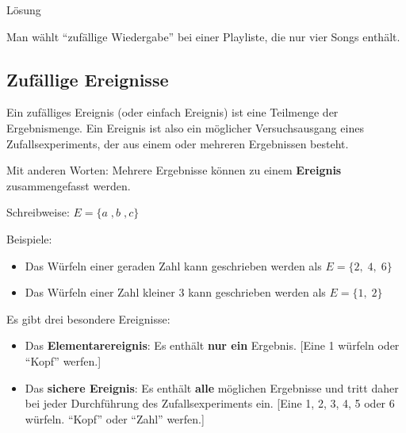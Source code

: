 \documentclass[
  ngerman,
]{book}
\providecommand{\tightlist}{%
  \setlength{\itemsep}{0pt}\setlength{\parskip}{0pt}}
\begin{document}
Lösung

Man wählt ``zufällige Wiedergabe'' bei einer Playliste, die nur vier Songs enthält.

\hypertarget{section-48}{%
\subsubsection*{}\label{section-48}}

\hypertarget{section-49}{%
\subsubsection*{}\label{section-49}}

\hypertarget{zufuxe4llige-ereignisse}{%
\subsection*{Zufällige Ereignisse}\label{zufuxe4llige-ereignisse}}

Ein zufälliges Ereignis (oder einfach Ereignis) ist eine Teilmenge der Ergebnismenge. Ein Ereignis ist also ein möglicher Versuchsausgang eines Zufallsexperiments, der aus einem oder mehreren Ergebnissen besteht.

Mit anderen Worten: Mehrere Ergebnisse können zu einem \textbf{Ereignis} zusammengefasst werden.

Schreibweise: \(E=\{a\;,b\;,c\}\)

Beispiele:

\begin{itemize}
\tightlist
\item
  Das Würfeln einer geraden Zahl kann geschrieben werden als \(E=\{2,\;4,\;6\}\)
\end{itemize}

\begin{itemize}
\tightlist
\item
  Das Würfeln einer Zahl kleiner 3 kann geschrieben werden als \(E=\{1,\;2\}\)
\end{itemize}

Es gibt drei besondere Ereignisse:

\begin{itemize}
\item
  Das \textbf{Elementarereignis}: Es enthält \textbf{nur ein} Ergebnis. {[}Eine 1 würfeln oder ``Kopf'' werfen.{]}
\item
  Das \textbf{sichere Ereignis}: Es enthält \textbf{alle} möglichen Ergebnisse und tritt daher bei jeder Durchführung des Zufallsexperiments ein. {[}Eine 1, 2, 3, 4, 5 oder 6 würfeln. ``Kopf'' oder ``Zahl'' werfen.{]}
\end{itemize}
\end{document}
